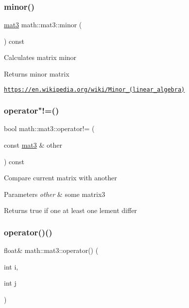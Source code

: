 \subsubsection{\texorpdfstring{minor()}{minor()}}
{\footnotesize\ttfamily \hyperlink{structmath_1_1mat3}{mat3} math\+::mat3\+::minor (\begin{DoxyParamCaption}{ }\end{DoxyParamCaption}) const\hspace{0.3cm}{\ttfamily [inline]}}

Calculates matrix minor \begin{DoxyReturn}{Returns}
minor matrix
\end{DoxyReturn}
\href{https://en.wikipedia.org/wiki/Minor_(linear_algebra)}{\tt https\+://en.\+wikipedia.\+org/wiki/\+Minor\+\_\+(linear\+\_\+algebra)} \mbox{\label{structmath_1_1mat3_a7c066c801ee697d900546606676b976a}} 
\subsubsection{\texorpdfstring{operator"!=()}{operator!=()}}
{\footnotesize\ttfamily bool math\+::mat3\+::operator!= (\begin{DoxyParamCaption}\item[{const \hyperlink{structmath_1_1mat3}{mat3} \&}]{other }\end{DoxyParamCaption}) const\hspace{0.3cm}{\ttfamily [inline]}}

Compare current matrix with another 
\begin{DoxyParams}{Parameters}
{\em other} & some matrix3 \\
\hline
\end{DoxyParams}
\begin{DoxyReturn}{Returns}
true if one at least one lement differ 
\end{DoxyReturn}
\mbox{\label{structmath_1_1mat3_a3eebeb880c3004739ddeba140795a251}} 
\subsubsection{\texorpdfstring{operator()()}{operator()()}\hspace{0.1cm}{\footnotesize\ttfamily [1/2]}}
{\footnotesize\ttfamily float\& math\+::mat3\+::operator() (\begin{DoxyParamCaption}\item[{int}]{i,  }\item[{int}]{j }\end{DoxyParamCaption})\hspace{0.3cm}{\ttfamily [inline]}}

